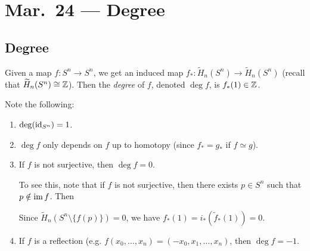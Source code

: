\chapter{Mar.~24 --- Degree}

\section{Degree}

\begin{definition}
  Given a map $f : S^n \to S^n$, we get an induced
  map $f_* : \widetilde{H}_n(S^n) \to \widetilde{H}_n(S^n)$ (recall that $\widetilde{H}_n(S^n) \cong \mathbb{Z}$).
  Then the \emph{degree} of $f$, denoted
  $\deg f$, is $f_*(1) \in \mathbb{Z}$.
\end{definition}

\begin{remark}
  Note the following:
  \begin{enumerate}
    \item $\deg (\operatorname{id}_{S^n}) = 1$.
    \item $\deg f$ only depends on $f$ up to homotopy
      (since $f_* = g_*$ if $f \simeq g$).
    \item If $f$ is not surjective, then $\deg f = 0$.

      To see this, note that if
      $f$ is not surjective, then there exists
      $p \in S^n$ such that $p \notin \operatorname{im} f$. Then
      \begin{center}
        \quad
      \end{center}
      Since $\widetilde{H}_n(S^n \setminus \{f(p)\}) = 0$, we have
      $f_*(1) = i_*(\widetilde{f}_*(1)) = 0$.
    \item If $f$ is a reflection (e.g.
      $f(x_0, \dots, x_n) = (-x_0, x_1, \dots, x_n)$, then $\deg f = -1$.


\end{enumerate}
\end{remark}
